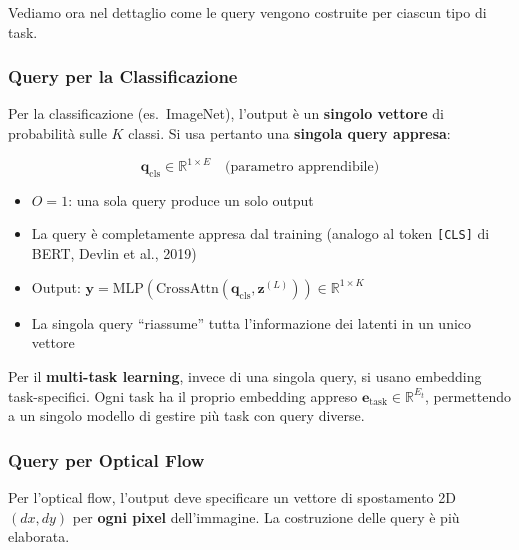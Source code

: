 \documentclass[12pt,a4paper]{article}
\begin{document}
Vediamo ora nel dettaglio come le query vengono costruite per ciascun tipo di task.

\subsubsection{Query per la Classificazione}

Per la classificazione (es.\ ImageNet), l'output \`e un \textbf{singolo vettore} di probabilit\`a sulle $K$ classi. Si usa pertanto una \textbf{singola query appresa}:

\begin{formulabox}
\[
\mathbf{q}_{\text{cls}} \in \mathbb{R}^{1 \times E} \quad \text{(parametro apprendibile)}
\]
\begin{itemize}
    \item $O = 1$: una sola query produce un solo output
    \item La query \`e completamente appresa dal training (analogo al token \texttt{[CLS]} di BERT, Devlin et al., 2019)
    \item Output: $\mathbf{y} = \text{MLP}(\text{CrossAttn}(\mathbf{q}_{\text{cls}}, \mathbf{z}^{(L)})) \in \mathbb{R}^{1 \times K}$
    \item La singola query ``riassume'' tutta l'informazione dei latenti in un unico vettore
\end{itemize}
\end{formulabox}

Per il \textbf{multi-task learning}, invece di una singola query, si usano embedding task-specifici. Ogni task ha il proprio embedding appreso $\mathbf{e}_{\text{task}} \in \mathbb{R}^{E_t}$, permettendo a un singolo modello di gestire pi\`u task con query diverse.

\subsubsection{Query per Optical Flow}

Per l'optical flow, l'output deve specificare un vettore di spostamento 2D $(dx, dy)$ per \textbf{ogni pixel} dell'immagine. La costruzione delle query \`e pi\`u elaborata.
\end{document}
